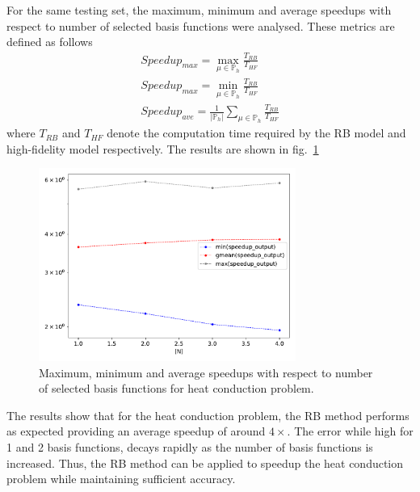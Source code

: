 \documentclass[11pt, oneside]{article}
\begin{document}
For the same testing set, the maximum, minimum and average speedups with respect to number of selected basis functions were analysed.  These metrics are defined as follows
\begin{align}
  Speedup_{max} = \max_{\mu \in \mathbb{P}_h} \frac{T_{RB}}{T_{HF}} \\
  Speedup_{max} = \min_{\mu \in \mathbb{P}_h} \frac{T_{RB}}{T_{HF}} \\
  Speedup_{ave} = \frac{1}{|\mathbb{P}_h|} \sum_{\mu \in \mathbb{P}_h} \frac{T_{RB}}{T_{HF}}
\end{align}
where $T_{RB}$ and $T_{HF}$ denote the computation time required by the RB model and high-fidelity model respectively. The results are shown in fig.~\ref{fig:tb_spdup}
    \begin{figure}[h!]
        \centering
        \includegraphics[width=0.75\textwidth]{figures/speedup_output.pdf}
        \caption{Maximum, minimum and average speedups with respect to number of selected basis functions for heat conduction problem.}
        \label{fig:tb_spdup}
    \end{figure}
The results show that for the heat conduction problem, the RB method performs as expected providing an average speedup of around $4\times$. The error while high for 1 and 2 basis functions, decays rapidly as the number of basis functions is increased. Thus, the RB method can be applied to speedup the heat conduction problem while maintaining sufficient accuracy.
\end{document}
